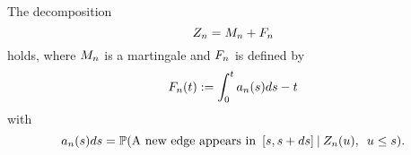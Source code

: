 \begin{lemma} \label{L: decomp Zn}
	The decomposition 
	\begin{equation} \label{E: decomp Zn}
	Z_n = M_n + F_n
	\end{equation}
	holds, where $M_n$ is a martingale and $F_n$ is defined by
	\begin{equation} \label{D: An}
	F_n(t) := \int_{0}^{t} a_n(s)ds - t
	\end{equation}
	with
	\begin{equation} \label{D: an}
	a_n(s)ds = \mathbb{P}(\text{A new edge appears in} \enspace [s, s+ds] \: | \: Z_n(u), \enspace u \leq s).
	\end{equation}
\end{lemma}

